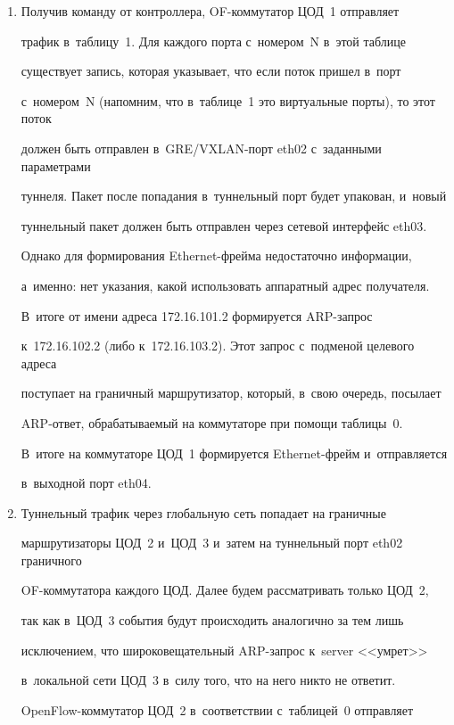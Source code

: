 \begin{enumerate}
и~eth04.2. В~результате пакет будет отправлен по всем возможным 


направлениям: в~ЦОД~2 и~в~ЦОД~3.


\item Получив команду от контроллера, OF-ком\-му\-та\-тор ЦОД~1 отправляет 


трафик в~таблицу~1. Для каждого порта с~номером~N в~этой таблице 


существует запись, которая указывает, что если поток пришел в~порт 


с~номером~N (напомним, что в~таблице~1 это виртуальные порты), то этот поток 


должен быть отправлен в~GRE/VXLAN-порт eth02 с~заданными параметрами 


туннеля. Пакет после попадания в~туннельный порт будет упакован, и~новый 


туннельный пакет должен быть отправлен через сетевой интерфейс eth03. 


Однако для формирования Ethernet-фрей\-ма недостаточно информации, 


а~именно: нет указания, какой использовать аппаратный адрес получателя. 


В~итоге от имени адреса 172.16.101.2 формируется ARP-за\-прос 


к~172.16.102.2 (либо к~172.16.103.2). Этот запрос с~подменой целевого адреса 


поступает на граничный маршрутизатор, который, в~свою очередь, посылает 


ARP-ответ, обрабатываемый на коммутаторе при помощи таб\-ли\-цы~0. 


В~итоге на коммутаторе ЦОД~1 формируется Ethernet-фрейм и~отправляется 


в~выходной порт eth04.


\item Туннельный трафик через глобальную сеть попадает на граничные 


маршрутизаторы ЦОД~2 и~ЦОД~3 и~затем на туннельный порт eth02 граничного 


OF-ком\-му\-та\-то\-ра каждого ЦОД. Далее будем рассматривать только ЦОД~2, 


так как в~ЦОД~3 события будут происходить аналогично за тем лишь 


исключением, что широковещательный ARP-запрос к~server <<умрет>> 


в~локальной сети ЦОД~3 в~силу того, что на него никто не ответит.  


OpenFlow-ком\-му\-та\-тор ЦОД~2 в~соответствии с~таб\-ли\-цей~0 отправляет 



\end{enumerate}

